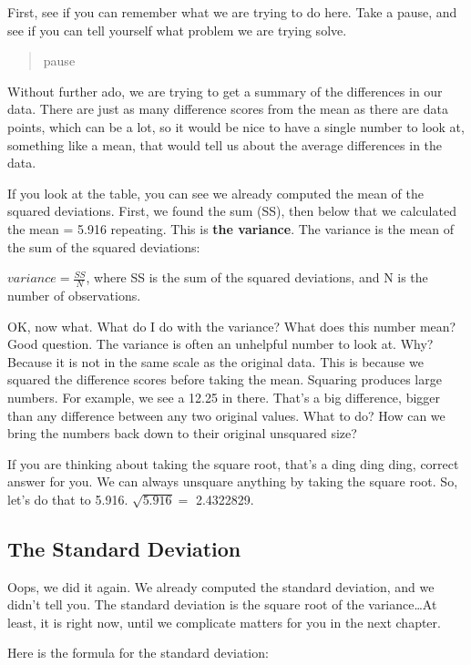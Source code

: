\documentclass[
]{book}
\begin{document}
First, see if you can remember what we are trying to do here. Take a pause, and see if you can tell yourself what problem we are trying solve.

\begin{quote}
pause
\end{quote}

Without further ado, we are trying to get a summary of the differences in our data. There are just as many difference scores from the mean as there are data points, which can be a lot, so it would be nice to have a single number to look at, something like a mean, that would tell us about the average differences in the data.

If you look at the table, you can see we already computed the mean of the squared deviations. First, we found the sum (SS), then below that we calculated the mean = 5.916 repeating. This is \textbf{the variance}. The variance is the mean of the sum of the squared deviations:

\(variance = \frac{SS}{N}\), where SS is the sum of the squared deviations, and N is the number of observations.

OK, now what. What do I do with the variance? What does this number mean? Good question. The variance is often an unhelpful number to look at. Why? Because it is not in the same scale as the original data. This is because we squared the difference scores before taking the mean. Squaring produces large numbers. For example, we see a 12.25 in there. That's a big difference, bigger than any difference between any two original values. What to do? How can we bring the numbers back down to their original unsquared size?

If you are thinking about taking the square root, that's a ding ding ding, correct answer for you. We can always unsquare anything by taking the square root. So, let's do that to 5.916. \(\sqrt{5.916} =\) 2.4322829.

\subsection{The Standard Deviation}\label{the-standard-deviation}

Oops, we did it again. We already computed the standard deviation, and we didn't tell you. The standard deviation is the square root of the variance\ldots At least, it is right now, until we complicate matters for you in the next chapter.

Here is the formula for the standard deviation:
\end{document}
